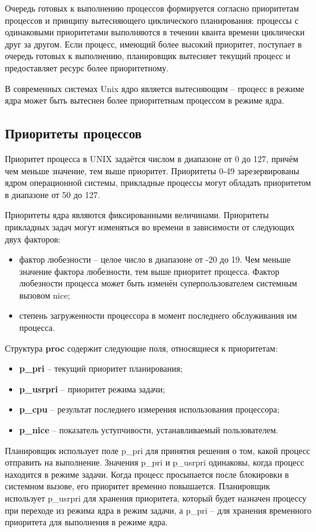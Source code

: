 Очередь готовых к выполнению процессов формируется согласно приоритетам процессов и принципу вытесняющего циклического планирования: процессы с одинаковыми приоритетами выполняются в течении кванта времени циклически друг за другом. Если процесс, имеющий более высокий приоритет, поступает в очередь готовых к выполнению, планировщик вытесняет текущий процесс и предоставляет ресурс более приоритетному.

В современных системах Unix ядро является вытесняющим -- процесс в режиме ядра может быть вытеснен более приоритетным процессом в режиме ядра.

\subsection{Приоритеты процессов}

Приоритет процесса в UNIX задаётся числом в диапазоне от 0 до 127, причём чем меньше значение, тем выше приоритет. Приоритеты 0-49 зарезервированы ядром операционной системы, прикладные процессы могут обладать приоритетом в диапазоне от 50 до 127.

Приоритеты ядра являются фиксированными величинами. Приоритеты прикладных задач могут изменяться во времени в зависимости от следующих двух факторов:

\begin{itemize}
	\item фактор любезности – целое число в диапазоне от -20 до 19. Чем меньше значение фактора любезности, тем выше приоритет процесса. Фактор любезности процесса может быть изменён суперпользователем системным вызовом nice;
	\item степень загруженности процессора в момент последнего обслуживания им процесса.
\end{itemize}

Структура \textbf{proc} содержит следующие поля, относящиеся к приоритетам:

\begin{itemize}
	\item \textbf{p\_pri} – текущий приоритет планирования;
	\item \textbf{p\_usrpri} – приоритет режима задачи;
	\item \textbf{p\_cpu} – результат последнего измерения использования процессора;
	\item \textbf{p\_nice} – показатель уступчивости, устанавливаемый пользователем.
\end{itemize}

Планировщик использует поле p\_pri для принятия решения о том, какой процесс отправить на выполнение. Значения p\_pri и p\_usrpri одинаковы, когда процесс находится в режиме задачи. Когда процесс просыпается после блокировки в системном вызове, его приоритет временно повышается. Планировщик использует p\_usrpri для хранения приоритета, который будет назначен процессу при переходе из режима ядра в режим задачи, а p\_pri – для хранения временного приоритета для выполнения в режиме ядра.

